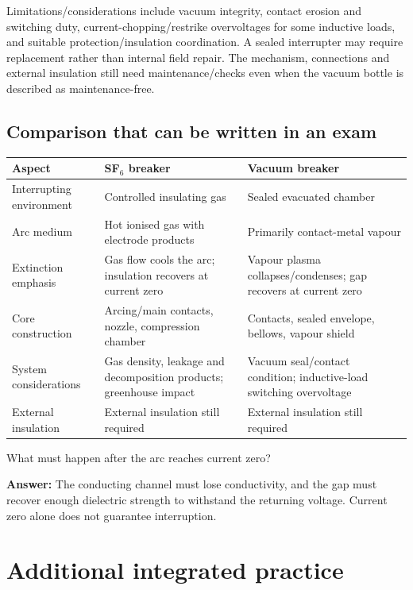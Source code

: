 \documentclass[11pt,a4paper]{article}
\renewcommand{\arraystretch}{1.22}
\newcommand{\chapterstart}[2]{\clearpage\section{#1}\label{#2}}
\newcommand{\checkq}[2]{\begin{tcolorbox}[breakable=false,colback=pale,colframe=teal,coltitle=white,title={Check your understanding}]#1\par\textbf{Answer:} #2\end{tcolorbox}}
\begin{document}
Limitations/considerations include vacuum integrity, contact erosion and switching duty, current-chopping/restrike overvoltages for some inductive loads, and suitable protection/insulation coordination. A sealed interrupter may require replacement rather than internal field repair. The mechanism, connections and external insulation still need maintenance/checks even when the vacuum bottle is described as maintenance-free.

\subsection{Comparison that can be written in an exam}
\begin{center}\small\renewcommand{\arraystretch}{1.08}
\begin{tabularx}{\textwidth}{L{.24\textwidth}L{.34\textwidth}Y}
\toprule Aspect & SF$_6$ breaker & Vacuum breaker\\\midrule
Interrupting environment & Controlled insulating gas & Sealed evacuated chamber\\
Arc medium & Hot ionised gas with electrode products & Primarily contact-metal vapour\\
Extinction emphasis & Gas flow cools the arc; insulation recovers at current zero & Vapour plasma collapses/condenses; gap recovers at current zero\\
Core construction & Arcing/main contacts, nozzle, compression chamber & Contacts, sealed envelope, bellows, vapour shield\\
System considerations & Gas density, leakage and decomposition products; greenhouse impact & Vacuum seal/contact condition; inductive-load switching overvoltage\\
External insulation & External insulation still required & External insulation still required\\\bottomrule
\end{tabularx}\end{center}
\checkq{What must happen after the arc reaches current zero?}{The conducting channel must lose conductivity, and the gap must recover enough dielectric strength to withstand the returning voltage. Current zero alone does not guarantee interruption.}

\chapterstart{Additional integrated practice}{integrated}
\end{document}
